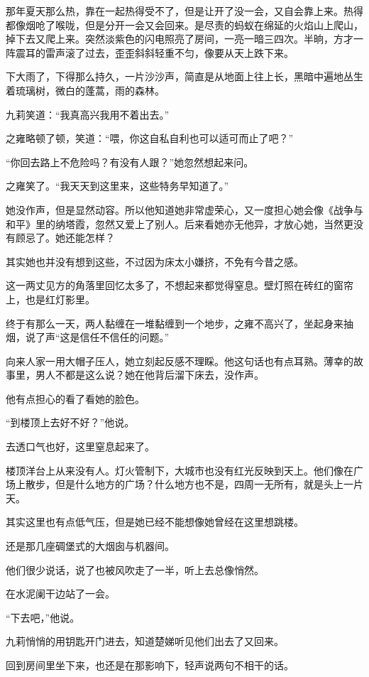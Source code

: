 \par 那年夏天那么热，靠在一起热得受不了，但是让开了没一会，又自会靠上来。热得都像烟呛了喉咙，但是分开一会又会回来。是尽责的蚂蚁在绵延的火焰山上爬山，掉下去又爬上来。突然淡紫色的闪电照亮了房间，一亮一暗三四次。半晌，方才一阵震耳的雷声滚了过去，歪歪斜斜轻重不匀，像要从天上跌下来。
\par 下大雨了，下得那么持久，一片沙沙声，简直是从地面上往上长，黑暗中遍地丛生着琉璃树，微白的蓬蒿，雨的森林。
\par 九莉笑道：“我真高兴我用不着出去。”
\par 之雍略顿了顿，笑道：“喂，你这自私自利也可以适可而止了吧？”
\par “你回去路上不危险吗？有没有人跟？”她忽然想起来问。
\par 之雍笑了。“我天天到这里来，这些特务早知道了。”
\par 她没作声，但是显然动容。所以他知道她非常虚荣心，又一度担心她会像《战争与和平》里的纳塔霞，忽然又爱上了别人。后来看她亦无他异，才放心她，当然更没有顾忌了。她还能怎样？
\par 其实她也并没有想到这些，不过因为床太小嫌挤，不免有今昔之感。
\par 这一两丈见方的角落里回忆太多了，不想起来都觉得窒息。壁灯照在砖红的窗帘上，也是红灯影里。
\par 终于有那么一天，两人黏缠在一堆黏缠到一个地步，之雍不高兴了，坐起身来抽烟，说了声“这是信任不信任的问题。”
\par 向来人家一用大帽子压人，她立刻起反感不理睬。他这句话也有点耳熟。薄幸的故事里，男人不都是这么说？她在他背后溜下床去，没作声。
\par 他有点担心的看了看她的脸色。
\par “到楼顶上去好不好？”他说。
\par 去透口气也好，这里窒息起来了。
\par 楼顶洋台上从来没有人。灯火管制下，大城市也没有红光反映到天上。他们像在广场上散步，但是什么地方的广场？什么地方也不是，四周一无所有，就是头上一片天。
\par 其实这里也有点低气压，但是她已经不能想像她曾经在这里想跳楼。
\par 还是那几座碉堡式的大烟囱与机器间。
\par 他们很少说话，说了也被风吹走了一半，听上去总像悄然。
\par 在水泥阑干边站了一会。
\par “下去吧，”他说。
\par 九莉悄悄的用钥匙开门进去，知道楚娣听见他们出去了又回来。
\par 回到房间里坐下来，也还是在那影响下，轻声说两句不相干的话。

